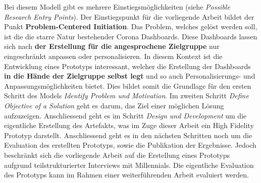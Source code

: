 Bei diesem Modell gibt es mehrere Einstiegsmöglichkeiten (siehe \textit{Possible Research Entry Points}). Der Einstiegspunkt für die vorliegende Arbeit bildet der Punkt \textbf{Problem-Centered Initiation}. Das Problem, welches gelöst werden soll, ist die die starre Natur bestehender Corona Dashboards. Diese Dashboards lassen sich nach \textbf{der Erstellung für die angesprochene Zielgruppe} nur eingeschränkt anpassen oder personalisieren. In diesem Kontext ist die Entwicklung eines Prototyps interessant, welcher die Erstellung der Dashboards \textbf{in die Hände der Zielgruppe selbst legt} und so auch Personalisierungs- und Anpassungsmöglichkeiten bietet. Dies bildet somit die Grundlage für den ersten Schritt des Models \textit{Identify Problem und Motivation}. Im zweiten Schritt \textit{Define Objective of a Solution} geht es darum, das Ziel einer möglichen Lösung aufzuzeigen. Anschliessend geht es im Schritt \textit{Design und Development} um die eigentliche Erstellung des Artefakts, was im Zuge dieser Arbeit ein High Fidelity Prototyp darstellt. Anschliessend geht es in den nächsten Schritten noch um die Evaluation des erstellten Prototyps, sowie die Publikation der Ergebnisse. Jedoch beschränkt sich die vorliegende Arbeit auf die Erstellung eines Prototyps aufgrund teilstrukturierter Interviews mit Millennials. Die eigentliche Evaluation des Prototyps kann im Rahmen einer weiterführenden Arbeit evaluiert werden.


